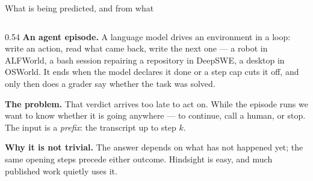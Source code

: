\documentclass[10pt, aspectratio=169]{beamer}
\begin{document}
\begin{frame}{What is being predicted, and from what}
\footnotesize
\begin{columns}[t]
\begin{column}{0.54\textwidth}
\textbf{An agent episode.} A language model drives an environment in a loop:
write an action, read what came back, write the next one --- a robot in
ALFWorld, a bash session repairing a repository in DeepSWE, a desktop in
OSWorld. It ends when the model declares it done or a step cap cuts it off,
and only then does a grader say whether the task was solved.

\smallskip
\textbf{The problem.} That verdict arrives too late to act on. While the
episode runs we want to know whether it is going anywhere --- to continue, call
a human, or stop. The input is a \emph{prefix}: the transcript up to step $k$.

\smallskip
\textbf{Why it is not trivial.} The answer depends on what has not happened
yet; the same opening steps precede either outcome. Hindsight is easy, and much
published work quietly uses it.


\end{column}
\end{columns}
\end{frame}
\end{document}
